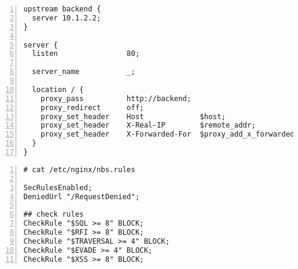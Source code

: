 \documentclass[Configuration]{subfiles}
\begin{document}
\begin{lstlisting}[frame=single,caption=/etc/nginx/sites-enabled/wordpress,backgroundcolor=\color{gray},breaklines=true,numbers=left,]
upstream backend {
  server 10.1.2.2;
}

server {
  listen                80;

  server_name           _;

  location / {
    proxy_pass          http://backend;
    proxy_redirect      off;
    proxy_set_header    Host             $host;
    proxy_set_header    X-Real-IP        $remote_addr;
    proxy_set_header    X-Forwarded-For  $proxy_add_x_forwarded_for;
  }
}
\end{lstlisting}

\begin{lstlisting}[frame=single,caption=Minimal whitelist rules,backgroundcolor=\color{gray},breaklines=true,numbers=left,]
# cat /etc/nginx/nbs.rules

SecRulesEnabled;
DeniedUrl "/RequestDenied";

## check rules
CheckRule "$SQL >= 8" BLOCK;
CheckRule "$RFI >= 8" BLOCK;
CheckRule "$TRAVERSAL >= 4" BLOCK;
CheckRule "$EVADE >= 4" BLOCK;
CheckRule "$XSS >= 8" BLOCK;
\end{lstlisting}
\end{document}
